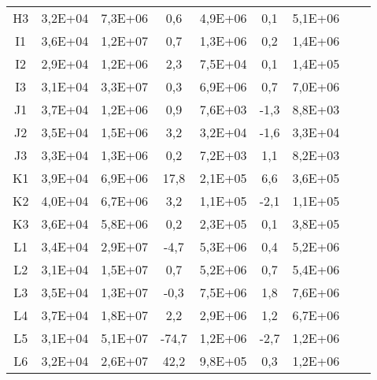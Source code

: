 \begin{center}
\begin{longtable}{ccccccccc}
H3    & 3,2E+04 & 7,3E+06 & 0,6   & 4,9E+06 & 0,1   & 5,1E+06 \\
I1    & 3,6E+04 & 1,2E+07 & 0,7   & 1,3E+06 & 0,2   & 1,4E+06 \\
I2    & 2,9E+04 & 1,2E+06 & 2,3   & 7,5E+04 & 0,1   & 1,4E+05 \\
I3    & 3,1E+04 & 3,3E+07 & 0,3   & 6,9E+06 & 0,7   & 7,0E+06 \\
J1    & 3,7E+04 & 1,2E+06 & 0,9   & 7,6E+03 & -1,3  & 8,8E+03 \\
J2    & 3,5E+04 & 1,5E+06 & 3,2   & 3,2E+04 & -1,6  & 3,3E+04 \\
J3    & 3,3E+04 & 1,3E+06 & 0,2   & 7,2E+03 & 1,1   & 8,2E+03 \\
K1    & 3,9E+04 & 6,9E+06 & 17,8  & 2,1E+05 & 6,6   & 3,6E+05 \\
K2    & 4,0E+04 & 6,7E+06 & 3,2   & 1,1E+05 & -2,1  & 1,1E+05 \\
K3    & 3,6E+04 & 5,8E+06 & 0,2   & 2,3E+05 & 0,1   & 3,8E+05 \\
L1    & 3,4E+04 & 2,9E+07 & -4,7  & 5,3E+06 & 0,4   & 5,2E+06 \\
L2    & 3,1E+04 & 1,5E+07 & 0,7   & 5,2E+06 & 0,7   & 5,4E+06 \\
L3    & 3,5E+04 & 1,3E+07 & -0,3  & 7,5E+06 & 1,8   & 7,6E+06 \\
L4    & 3,7E+04 & 1,8E+07 & 2,2   & 2,9E+06 & 1,2   & 6,7E+06 \\
L5    & 3,1E+04 & 5,1E+07 & -74,7 & 1,2E+06 & -2,7  & 1,2E+06 \\
L6    & 3,2E+04 & 2,6E+07 & 42,2  & 9,8E+05 & 0,3   & 1,2E+06 \\
\end{longtable}
\end{center}

